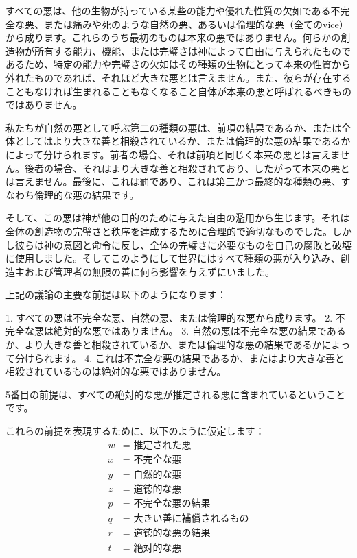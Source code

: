 \documentclass[a4paper,11pt,openany]{ltjsbook}
\begin{document}
すべての悪は、他の生物が持っている某些の能力や優れた性質の欠如である不完全な悪、または痛みや死のような自然の悪、あるいは倫理的な悪（全てのvice）から成ります。これらのうち最初のものは本来の悪ではありません。何らかの創造物が所有する能力、機能、または完璧さは神によって自由に与えられたものであるため、特定の能力や完璧さの欠如はその種類の生物にとって本来の性質から外れたものであれば、それほど大きな悪とは言えません。また、彼らが存在することもなければ生まれることもなくなること自体が本来の悪と呼ばれるべきものではありません。

私たちが自然の悪として呼ぶ第二の種類の悪は、前項の結果であるか、または全体としてはより大きな善と相殺されているか、または倫理的な悪の結果であるかによって分けられます。前者の場合、それは前項と同じく本来の悪とは言えません。後者の場合、それはより大きな善と相殺されており、したがって本来の悪とは言えません。最後に、これは罰であり、これは第三かつ最終的な種類の悪、すなわち倫理的な悪の結果です。

そして、この悪は神が他の目的のために与えた自由の濫用から生じます。それは全体の創造物の完璧さと秩序を達成するために合理的で適切なものでした。しかし彼らは神の意図と命令に反し、全体の完璧さに必要なものを自己の腐敗と破壊に使用しました。そしてこのようにして世界にはすべて種類の悪が入り込み、創造主および管理者の無限の善に何ら影響を与えずにいました。

上記の議論の主要な前提は以下のようになります：

1. すべての悪は不完全な悪、自然の悪、または倫理的な悪から成ります。
2. 不完全な悪は絶対的な悪ではありません。
3. 自然の悪は不完全な悪の結果であるか、より大きな善と相殺されているか、または倫理的な悪の結果であるかによって分けられます。
4. これは不完全な悪の結果であるか、またはより大きな善と相殺されているものは絶対的な悪ではありません。

5番目の前提は、すべての絶対的な悪が推定される悪に含まれているということです。

これらの前提を表現するために、以下のように仮定します：
\begin{align*}
  w &= \text{ 推定された悪} \\
  x &= \text{ 不完全な悪} \\
  y &= \text{ 自然的な悪} \\
  z &= \text{ 道徳的な悪} \\
  p &= \text{ 不完全な悪の結果} \\
  q &= \text{ 大きい善に補償されるもの} \\
  r &= \text{ 道徳的な悪の結果} \\
  t &= \text{ 絶対的な悪}
\end{align*}
\end{document}
